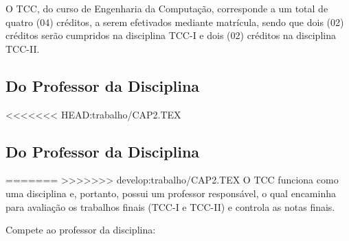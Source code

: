 O TCC, do curso de Engenharia da Computação, corresponde a um total de quatro (04) cr\'editos, a serem efetivados mediante matrícula, sendo que dois (02) cr\'editos serão cumpridos na disciplina TCC-I e dois (02) cr\'editos na disciplina  TCC-II. 


\subsection{Do Professor da Disciplina}

<<<<<<< HEAD:trabalho/CAP2.TEX

\subsection{Do Professor da Disciplina}

=======
>>>>>>> develop:trabalho/CAP2.TEX
O TCC funciona como uma disciplina e, portanto, possui um professor responsável, o qual encaminha para avaliação os trabalhos finais (TCC-I e TCC-II) e controla as notas finais. 

Compete ao professor da disciplina:

